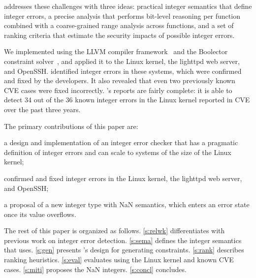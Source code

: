 \sys addresses these challenges with three ideas:
practical integer semantics that define integer errors,
a precise analysis that performs bit-level reasoning per function
combined with a coarse-grained range analysis across functions,
and a set of ranking criteria that estimate the security impacts
of possible integer errors.

We implemented \sys using the LLVM compiler framework~\cite{lattner:llvm}
and the Boolector constraint solver~\cite{boolector}, and applied it
to the Linux kernel, the lighttpd web server, and OpenSSH\@.  \sys
identified \nrbugs integer errors in these systems, which were
confirmed and fixed by the developers.  It also revealed that even
two previously known CVE cases were fixed incorrectly.
\sys's reports are fairly complete: it is able to detect 34 out of the
36 known integer errors in the Linux kernel reported in CVE over the past
three years.

%

The primary contributions of this paper are:
\begin{CompactItemize}
\item a design and implementation of an integer error checker that has a 
  pragmatic definition of integer errors and can scale to systems of the 
  size of the Linux kernel;
\item \nrbugs confirmed and fixed integer errors in
  the Linux kernel, the lighttpd web server, and OpenSSH;
\item a proposal of a new integer type with NaN semantics, which
  enters an error state once its value overflows. 
\end{CompactItemize}

The rest of this paper is organized as follows.
\autoref{s:relwk} differentiates \sys with previous work on integer 
error detection. \autoref{s:sema}
defines the integer semantics that \sys uses.  \autoref{s:gen}
presents \sys's design for generating constraints.  \autoref{s:rank}
describes ranking heuristics.  \autoref{s:eval} evaluates \sys using
the Linux kernel and known CVE cases.
\autoref{s:miti} proposes the NaN integers.
\autoref{s:concl} concludes.
